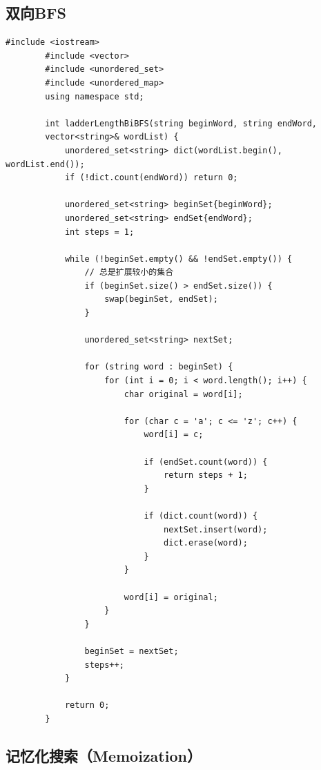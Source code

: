 \documentclass[12pt,a4paper]{article}
\begin{document}
	\subsection{双向BFS}
	
	\begin{lstlisting}[caption={双向BFS示例：单词接龙优化}]
		#include <iostream>
		#include <vector>
		#include <unordered_set>
		#include <unordered_map>
		using namespace std;
		
		int ladderLengthBiBFS(string beginWord, string endWord, 
		vector<string>& wordList) {
			unordered_set<string> dict(wordList.begin(), wordList.end());
			if (!dict.count(endWord)) return 0;
			
			unordered_set<string> beginSet{beginWord};
			unordered_set<string> endSet{endWord};
			int steps = 1;
			
			while (!beginSet.empty() && !endSet.empty()) {
				// 总是扩展较小的集合
				if (beginSet.size() > endSet.size()) {
					swap(beginSet, endSet);
				}
				
				unordered_set<string> nextSet;
				
				for (string word : beginSet) {
					for (int i = 0; i < word.length(); i++) {
						char original = word[i];
						
						for (char c = 'a'; c <= 'z'; c++) {
							word[i] = c;
							
							if (endSet.count(word)) {
								return steps + 1;
							}
							
							if (dict.count(word)) {
								nextSet.insert(word);
								dict.erase(word);
							}
						}
						
						word[i] = original;
					}
				}
				
				beginSet = nextSet;
				steps++;
			}
			
			return 0;
		}
	\end{lstlisting}
	
	\subsection{记忆化搜索（Memoization）}
	
\end{document}
